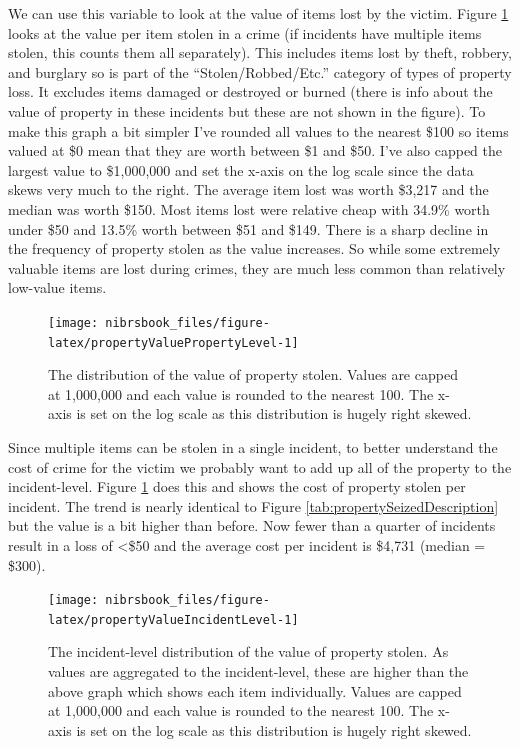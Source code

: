 \documentclass[
  12pt,
  openany]{book}
\begin{document}
We can use this variable to look at the value of items lost by the victim. Figure \ref{fig:propertyValuePropertyLevel} looks at the value per item stolen in a crime (if incidents have multiple items stolen, this counts them all separately). This includes items lost by theft, robbery, and burglary so is part of the ``Stolen/Robbed/Etc.'' category of types of property loss. It excludes items damaged or destroyed or burned (there is info about the value of property in these incidents but these are not shown in the figure). To make this graph a bit simpler I've rounded all values to the nearest \$100 so items valued at \$0 mean that they are worth between \$1 and \$50. I've also capped the largest value to \$1,000,000 and set the x-axis on the log scale since the data skews very much to the right. The average item lost was worth \$3,217 and the median was worth \$150. Most items lost were relative cheap with 34.9\% worth under \$50 and 13.5\% worth between \$51 and \$149. There is a sharp decline in the frequency of property stolen as the value increases. So while some extremely valuable items are lost during crimes, they are much less common than relatively low-value items.

\begin{figure}

{\centering \texttt{[image: nibrsbook\_files/figure-latex/propertyValuePropertyLevel-1]} 

}

\caption{The distribution of the value of property stolen. Values are capped at 1,000,000 and each value is rounded to the nearest 100. The x-axis is set on the log scale as this distribution is hugely right skewed.}\label{fig:propertyValuePropertyLevel}
\end{figure}

Since multiple items can be stolen in a single incident, to better understand the cost of crime for the victim we probably want to add up all of the property to the incident-level. Figure \ref{fig:propertyValuePropertyLevel} does this and shows the cost of property stolen per incident. The trend is nearly identical to Figure \ref{tab:propertySeizedDescription} but the value is a bit higher than before. Now fewer than a quarter of incidents result in a loss of \textless\$50 and the average cost per incident is \$4,731 (median = \$300).

\begin{figure}

{\centering \texttt{[image: nibrsbook\_files/figure-latex/propertyValueIncidentLevel-1]} 

}

\caption{The incident-level distribution of the value of property stolen. As values are aggregated to the incident-level, these are higher than the above graph which shows each item individually. Values are capped at 1,000,000 and each value is rounded to the nearest 100. The x-axis is set on the log scale as this distribution is hugely right skewed.}\label{fig:propertyValueIncidentLevel}
\end{figure}
\end{document}
